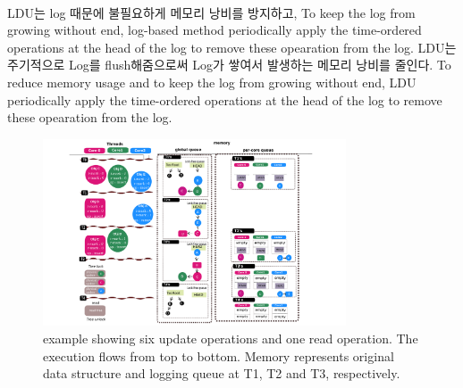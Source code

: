 \
\fi


\ifkor
LDU는 log 때문에 불필요하게 메모리 낭비를 방지하고, To keep the log from growing without end,
log-based method periodically apply the time-ordered operations at the head of
the log to remove these opearation from the log.
LDU는 주기적으로 Log를 flush해줌으로써 Log가 쌓여서 발생하는 메모리 낭비를 줄인다.
\else
To reduce memory usage and to keep the log from growing without end, LDU
periodically apply the time-ordered operations at the head of the log to remove
these opearation from the log.

\fi



\begin{figure}[t!]
  \begin{center}
     \includegraphics[width=0.8\textwidth,height=0.4\textheight,keepaspectratio]{fig/basic_gldu}
  \end{center}
  \caption{ example showing six update operations and one read
  operation. The execution flows from top to bottom. Memory represents original
  data structure and logging queue at T1, T2 and T3, respectively.}
  \label{fig:basic}
\end{figure}


